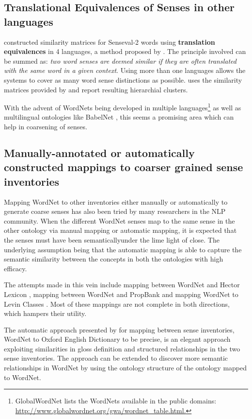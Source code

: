 \subsection{Translational Equivalences of Senses in other languages}
\citep{chugur2002polysemy} constructed similarity matrices for Senseval-2 \citep{Edmonds:2001} words using \textbf{translation equivalences} in 4 languages, a method proposed by \citep{resnik1999distinguishing}.
The principle involved can be summed as: \textit{two word senses are deemed similar if they are often translated with the same word in a given context}. Using more than one languages allows the systems to cover as many word sense distinctions as possible. \citep{agirre2003clustering} uses the similarity matrices provided by \citep{chugur2002polysemy} and report resulting hierarchial clusters.

With the advent of WordNets being developed in multiple languages\footnote{GlobalWordNet lists the WordNets available in the public domains: \url{http://www.globalwordnet.org/gwa/wordnet_table.html.}} as well as multilingual ontologies like BabelNet \citep{NavigliPonzetto:12aij}, this seems a promising area which can help in coarsening of senses.


\subsection{Manually-annotated or automatically constructed mappings to coarser grained sense inventories}
Mapping WordNet to other inventories either manually or automatically to generate coarse senses has also been  tried by many researchers in the NLP community. When the different WordNet senses map to the same sense in the other ontology via manual mapping or automatic mapping, it is expected that the senses must have been semanticallyunder the lime light of close. The underlying assumption being that the automatic mapping is able to capture the semantic similarity between the concepts in both the ontologies with high efficacy.

The attempts made in this vein include mapping between WordNet and Hector Lexicon \citep{palmer2007making}, mapping between WordNet and PropBank \citep{palmer2004different} and mapping WordNet to Levin Classes \citep{levin1993english} \citep{palmer2007making}. Most of these mappings are not complete in both directions, which hampers their utility.

The automatic approach presented by \citep{Navigli06meaningfulclustering} for mapping between sense inventories, WordNet to Oxford English Dictionary to be precise, is an elegant approach exploiting similarities in gloss definition and structured relationships in the two sense inventories. The approach can be extended to discover more semantic relationships in WordNet by using the ontology structure of the ontology mapped to WordNet.

